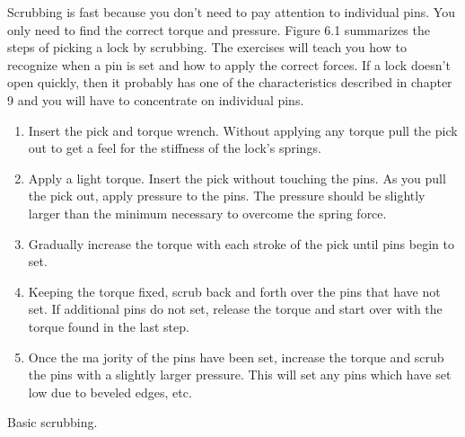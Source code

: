 Scrubbing is fast because you don't need to pay attention to individual pins. You only
need to find the correct torque and pressure. Figure 6.1 summarizes the steps of picking a
lock by scrubbing. The exercises will teach you how to recognize when a pin is set and how
to apply the correct forces. If a lock doesn't open quickly, then it probably has one of the
characteristics described in chapter 9 and you will have to concentrate on individual pins.

\begin{table}
    \begin{enumerate}
        \item Insert the pick and torque wrench. Without applying any torque pull the pick out to
        get a feel for the stiffness of the lock's springs.
        \item Apply a light torque. Insert the pick without touching the pins. As you pull the
        pick out, apply pressure to the pins. The pressure should be slightly larger than the
        minimum necessary to overcome the spring force.
        \item Gradually increase the torque with each stroke of the pick until pins begin to set.
        \item Keeping the torque fixed, scrub back and forth over the pins that have not set. If
        additional pins do not set, release the torque and start over with the torque found in
        the last step.
        \item Once the ma jority of the pins have been set, increase the torque and scrub the pins
        with a slightly larger pressure. This will set any pins which have set low due to beveled
        edges, etc.
    \end{enumerate}
    \caption{Basic scrubbing.}
\end{table}
